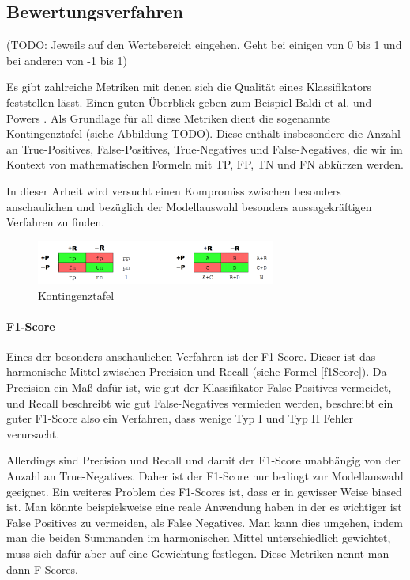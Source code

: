 \subsection{Bewertungsverfahren}

(TODO: Jeweils auf den Wertebereich eingehen. Geht bei einigen von 0 bis 1 und bei anderen von -1 bis 1)

Es gibt zahlreiche Metriken mit denen sich die Qualität eines Klassifikators feststellen lässt. Einen guten Überblick geben zum Beispiel Baldi et al. \cite{Baldi2000} und Powers \cite{Powers2011}. Als Grundlage für all diese Metriken dient die sogenannte Kontingenztafel (siehe Abbildung TODO). Diese enthält insbesondere die Anzahl an True-Positives, False-Positives, True-Negatives und False-Negatives, die wir im Kontext von mathematischen Formeln mit TP, FP, TN und FN abkürzen werden.

In dieser Arbeit wird versucht einen Kompromiss zwischen besonders anschaulichen und bezüglich der Modellauswahl besonders aussagekräftigen Verfahren zu finden.

\begin{figure}[!h]
    \centering
    \includegraphics[width=0.7\textwidth]{pics/contingency.png}
    \caption{Kontingenztafel \cite{Powers2011}}
    \label{fig:VergleichScores}
\end{figure}


\paragraph{F1-Score}

Eines der besonders anschaulichen Verfahren ist der F1-Score. Dieser ist das harmonische Mittel zwischen Precision und Recall (siehe Formel \ref{f1Score}). Da Precision ein Maß dafür ist, wie gut der Klassifikator False-Positives vermeidet, und Recall beschreibt wie gut False-Negatives vermieden werden, beschreibt ein guter F1-Score also ein Verfahren, dass wenige Typ I und Typ II Fehler verursacht.

Allerdings sind Precision und Recall und damit der F1-Score unabhängig von der Anzahl an True-Negatives. Daher ist der F1-Score nur bedingt zur Modellauswahl geeignet. 
Ein weiteres Problem des F1-Scores ist, dass er in gewisser Weise biased ist. Man könnte beispielsweise eine reale Anwendung haben in der es wichtiger ist False Positives zu vermeiden, als False Negatives. Man kann dies umgehen, indem man die beiden Summanden im harmonischen Mittel unterschiedlich gewichtet, muss sich dafür aber auf eine Gewichtung festlegen. Diese Metriken nennt man dann F-Scores.

